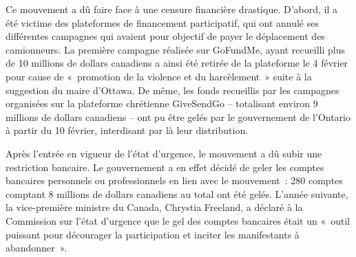 Ce mouvement a dû faire face à une censure financière drastique. D'abord, il a été victime des plateformes de financement participatif, qui ont annulé ses différentes campagnes qui avaient pour objectif de payer le déplacement des camionneurs. La première campagne réalisée sur GoFundMe, ayant recueilli plus de 10 millions de dollars canadiens a ainsi été retirée de la plateforme le 4 février pour cause de «~promotion de la violence et du harcèlement~» suite à la suggestion du maire d'Ottawa. De même, les fonds recueillis par les campagnes organisées sur la plateforme chrétienne GiveSendGo -- totalisant environ 9 millions de dollars canadiens -- ont pu être gelés par le gouvernement de l'Ontario à partir du 10 février, interdisant par là leur distribution.

Après l'entrée en vigueur de l'état d'urgence, le mouvement a dû subir une restriction bancaire. Le gouvernement a en effet décidé de geler les comptes bancaires personnels ou professionnels en lien avec le mouvement~: 280 comptes comptant 8 millions de dollars canadiens au total ont été gelés. L'année suivante, la vice-première ministre du Canada, Chrystia Freeland, a déclaré à la Commission sur l'état d'urgence que le gel des comptes bancaires était un «~outil puissant pour décourager la participation et inciter les manifestants à abandonner~».

